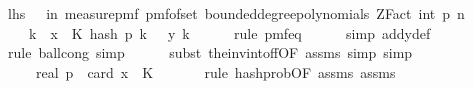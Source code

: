 \begin{isabellebody}
\ {\isachardoublequoteopen}{\isacharquery}{\kern0pt}lhs\ {\isacharequal}{\kern0pt}\ {\isasymP}{\isacharparenleft}{\kern0pt}{\isasymomega}\ in\ measure{\isacharunderscore}{\kern0pt}pmf\ {\isacharparenleft}{\kern0pt}pmf{\isacharunderscore}{\kern0pt}of{\isacharunderscore}{\kern0pt}set\ {\isacharparenleft}{\kern0pt}bounded{\isacharunderscore}{\kern0pt}degree{\isacharunderscore}{\kern0pt}polynomials\ {\isacharparenleft}{\kern0pt}ZFact\ {\isacharparenleft}{\kern0pt}int\ p{\isacharparenright}{\kern0pt}{\isacharparenright}{\kern0pt}\ n{\isacharparenright}{\kern0pt}{\isacharparenright}{\kern0pt}{\isachardot}{\kern0pt}\isanewline
\ \ \ \ {\isacharparenleft}{\kern0pt}{\isasymforall}k\ {\isasymin}\ x\ {\isacharbackquote}{\kern0pt}\ K{\isachardot}{\kern0pt}\ hash\ p\ k\ {\isasymomega}\ {\isacharequal}{\kern0pt}\ y{\isacharprime}{\kern0pt}\ k{\isacharparenright}{\kern0pt}{\isacharparenright}{\kern0pt}{\isachardoublequoteclose}\isanewline
\ \ \ \ \isamarkupfalse%
\ {\isacharparenleft}{\kern0pt}rule\ pmf{\isacharunderscore}{\kern0pt}eq{\isacharparenright}{\kern0pt}\isanewline
\ \ \ \ \isamarkupfalse%
\ {\isacharparenleft}{\kern0pt}simp\ add{\isacharcolon}{\kern0pt}y{\isacharprime}{\kern0pt}{\isacharunderscore}{\kern0pt}def{\isacharparenright}{\kern0pt}\isanewline
\ \ \ \ \isamarkupfalse%
\ {\isacharparenleft}{\kern0pt}rule\ ball{\isacharunderscore}{\kern0pt}cong{\isacharcomma}{\kern0pt}\ simp{\isacharparenright}{\kern0pt}\isanewline
\ \ \ \ \isamarkupfalse%
\ {\isacharparenleft}{\kern0pt}subst\ the{\isacharunderscore}{\kern0pt}inv{\isacharunderscore}{\kern0pt}into{\isacharunderscore}{\kern0pt}f{\isacharunderscore}{\kern0pt}f{\isacharbrackleft}{\kern0pt}OF\ assms{\isacharparenleft}{\kern0pt}{}{\isacharparenright}{\kern0pt}{\isacharbrackright}{\kern0pt}{\isacharcomma}{\kern0pt}\ simp{\isacharcomma}{\kern0pt}\ simp{\isacharparenright}{\kern0pt}\isanewline
\ \ \isamarkupfalse%
\ \isamarkupfalse%
\ {\isachardoublequoteopen}{\isachardot}{\kern0pt}{\isachardot}{\kern0pt}{\isachardot}{\kern0pt}\ {\isacharequal}{\kern0pt}\ {}\ {\isacharslash}{\kern0pt}\ real\ p\ {\isacharcircum}{\kern0pt}\ card\ {\isacharparenleft}{\kern0pt}x\ {\isacharbackquote}{\kern0pt}\ K{\isacharparenright}{\kern0pt}{\isachardoublequoteclose}\ \isanewline
\ \ \ \ \isamarkupfalse%
\ {\isacharparenleft}{\kern0pt}rule\ hash{\isacharunderscore}{\kern0pt}prob{\isacharbrackleft}{\kern0pt}OF\ assms{\isacharparenleft}{\kern0pt}{}{\isacharparenright}{\kern0pt}\ assms{\isacharparenleft}{\kern0pt}{}{\isacharparenright}{\kern0pt}{\isacharbrackright}{\kern0pt}{\isacharparenright}{\kern0pt}\ \isanewline

\end{isabellebody}
